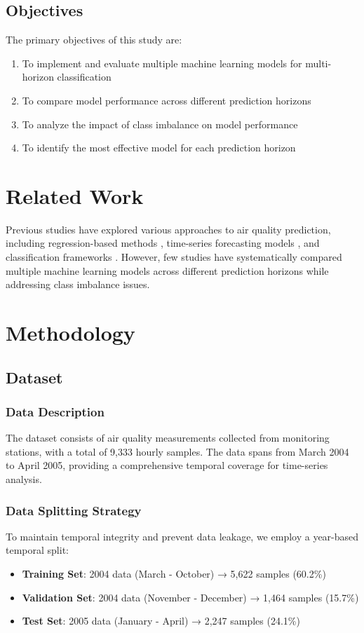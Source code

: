 \documentclass[12pt,a4paper]{article}
\begin{document}
\subsection{Objectives}

The primary objectives of this study are:
\begin{enumerate}
    \item To implement and evaluate multiple machine learning models for multi-horizon classification
    \item To compare model performance across different prediction horizons
    \item To analyze the impact of class imbalance on model performance
    \item To identify the most effective model for each prediction horizon
\end{enumerate}

\section{Related Work}

Previous studies have explored various approaches to air quality prediction, including regression-based methods \cite{ref1}, time-series forecasting models \cite{ref2}, and classification frameworks \cite{ref3}. However, few studies have systematically compared multiple machine learning models across different prediction horizons while addressing class imbalance issues.

\section{Methodology}

\subsection{Dataset}

\subsubsection{Data Description}
The dataset consists of air quality measurements collected from monitoring stations, with a total of 9,333 hourly samples. The data spans from March 2004 to April 2005, providing a comprehensive temporal coverage for time-series analysis.

\subsubsection{Data Splitting Strategy}
To maintain temporal integrity and prevent data leakage, we employ a year-based temporal split:
\begin{itemize}
    \item \textbf{Training Set}: 2004 data (March - October) → 5,622 samples (60.2\%)
    \item \textbf{Validation Set}: 2004 data (November - December) → 1,464 samples (15.7\%)
    \item \textbf{Test Set}: 2005 data (January - April) → 2,247 samples (24.1\%)
\end{itemize}
\end{document}

